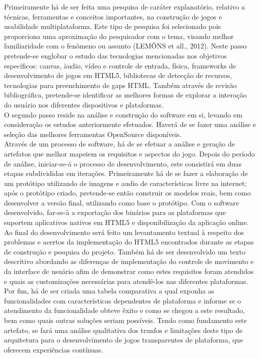 \documentclass{article}
\begin{document}
Primeiramente há de ser feita uma pesquisa de caráter explanatório, relativo a técnicas, ferramentas e conceitos importantes, na construção de jogos e usabilidade multiplataforma. Este tipo de pesquisa foi selecionado pois proporciona uma aproximação do pesquisador com o tema, visando melhor familiaridade com o fenômeno ou assunto (LEMÕNS et all., 2012). Neste passo pretende-se englobar o estudo das tecnologias mencionadas nos objetivos específicos: canvas, àudio, vídeo e controle de entrada, física, frameworks de desenvolvimento de jogos em HTML5, bibliotecas de detecção de recursos, tecnologias para preenchimento de gaps HTML. Também através de revisão bibliográfica, pretende-se identificar as melhores formas de explorar a interação do usuário nos diferentes dispositivos e plataformas.
\\
	O segundo passo reside na análise e construção do software em si, levando em consideração os estudos anteriormente efetuados. Haverá de se fazer uma análise e seleção das melhores ferramentas OpenSource disponíveis. 
\\
	Através de um processo de software, há de se efetuar a análise e geração de artefatos que melhor mapeiem os requisitos e aspectos do jogo. Depois do período de análise, iniciar-se-á o processo de desenvolvimento, este consistirá em duas etapas subdivididas em iterações. Primeiramente há de se fazer a elaboração de um protótipo utilizando de imagens e audio de características livre na internet; após o protótipo criado, pretende-se então construir os modelos reais, bem como desenvolver a versão final, utilizando como base o protótipo. Com o software desenvolvido, far-se-à a exportação dos binários para as plataformas que suportem aplicativos nativos em HTML5 e disponibilização da aplicação online.
\\
	Ao final do desenvolvimento será feito um levantamento textual à respeito dos problemas e acertos da implementação do HTML5 encontrados durante as etapas de construção e pesquisa do projeto. Também há de ser desenvolvido um texto descritivo abordando as diferenças de implementação do controle de movimento e da interface de usuário afim de demonstrar como estes requisitos foram atendidos e quais as customizações necessárias para atendê-los nas diferentes plataformas.
\\
	Por fim, há de ser criada  uma tabela comparativa a qual exponha as funcionalidades com características dependentes de plataforma e informe se o atendimento da funcionalidade obteve êxito e como se chegou a este resultado, bem como quais outras soluções seriam possíveis. Tendo como fundamento este artefato, se fará uma análise qualitativa dos trunfos e limitações deste tipo de arquitetura para o desenvolvimento de jogos transparentes de plataforma, que oferecem experiências contínuas.
\end{document}
